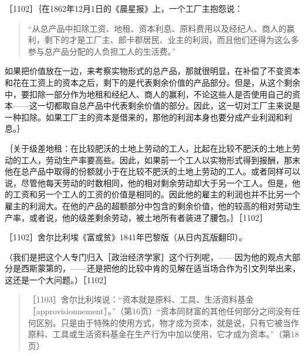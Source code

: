 
［1102］｛在1862年12月1日的《晨星报》上，一个工厂主抱怨说：

\begin{quote}{“从总产品中扣除工资、地租、资本利息、原料费用以及经纪人、商人的赢利，剩下的才是工厂主、郎卡郡居民、业主的利润，而且他们还得为这么多参与总产品分配的人负担工人的生活费。”}\end{quote}

如果把价值放在一边，来考察实物形式的总产品，那就很明显，在补偿了不变资本和花在工资上的资本之后，剩下的是代表剩余价值的产品部分。但是，从这个剩余中，要扣除一部分作为地租和经纪人、商人的赢利，不论这些人是否使用自己的资本——这一切都取自总产品中代表剩余价值的部分。因此，这一切对工厂主来说是一种扣除。如果工厂主的资本是借来的，那他的利润本身也要分成产业利润和利息。｝

｛关于级差地租：在比较肥沃的土地上劳动的工人，比起在比较不肥沃的土地上劳动的工人，劳动生产率要高些。因此，如果前一个工人以实物形式得到报酬，那末他在总产品中取得的份额就小于在比较不肥沃的土地上劳动的工人。或者同样可以说，尽管他每天劳动的时数相同，他的相对剩余劳动却大于另一个工人。但是，他的工资和另一个工人的工资的价值是相同的。因此他的雇主的利润也并不比另一个雇主的利润大。在他的产品的超额部分中包含的剩余价值，他的较高的相对劳动生产率，或者说，他的级差剩余劳动，被土地所有者装进了腰包。｝［1102］


［1102］舍尔比利埃《富或贫》1841年巴黎版（从日内瓦版翻印）。

（我们是把这个人专门归入［政治经济学家］这个行列呢，——因为他的观点大部分是西斯蒙第的，——还是把他的比较中肯的见解在适当场合作为引文列举出来，这还是一个大问题。）［1102］


\begin{quote}{［1103］舍尔比利埃说：“资本就是原料、工具、生活资料基金［approvisionnement］。”（第16页）“资本同财富的其他任何部分之间没有任何区别。只是由于特殊的使用方式，物才成为资本，就是说，只有它被当作原料、工具或生活资料基金在生产行为中加以使用，它才成为资本。”（第18页）}\end{quote}

